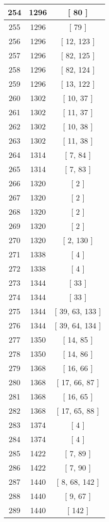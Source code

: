 \begin{center}
\begin{longtable}[H]{|| c c c ||}
254 & 1296 & [ 80 ] \\ 
\hline
255 & 1296 & [ 79 ] \\ 
\hline
256 & 1296 & [ 12, 123 ] \\ 
\hline
257 & 1296 & [ 82, 125 ] \\ 
\hline
258 & 1296 & [ 82, 124 ] \\ 
\hline
259 & 1296 & [ 13, 122 ] \\ 
\hline
260 & 1302 & [ 10, 37 ] \\ 
\hline
261 & 1302 & [ 11, 37 ] \\ 
\hline
262 & 1302 & [ 10, 38 ] \\ 
\hline
263 & 1302 & [ 11, 38 ] \\ 
\hline
264 & 1314 & [ 7, 84 ] \\ 
\hline
265 & 1314 & [ 7, 83 ] \\ 
\hline
266 & 1320 & [ 2 ] \\ 
\hline
267 & 1320 & [ 2 ] \\ 
\hline
268 & 1320 & [ 2 ] \\ 
\hline
269 & 1320 & [ 2 ] \\ 
\hline
270 & 1320 & [ 2, 130 ] \\ 
\hline
271 & 1338 & [ 4 ] \\ 
\hline
272 & 1338 & [ 4 ] \\ 
\hline
273 & 1344 & [ 33 ] \\ 
\hline
274 & 1344 & [ 33 ] \\ 
\hline
275 & 1344 & [ 39, 63, 133 ] \\ 
\hline
276 & 1344 & [ 39, 64, 134 ] \\ 
\hline
277 & 1350 & [ 14, 85 ] \\ 
\hline
278 & 1350 & [ 14, 86 ] \\ 
\hline
279 & 1368 & [ 16, 66 ] \\ 
\hline
280 & 1368 & [ 17, 66, 87 ] \\ 
\hline
281 & 1368 & [ 16, 65 ] \\ 
\hline
282 & 1368 & [ 17, 65, 88 ] \\ 
\hline
283 & 1374 & [ 4 ] \\ 
\hline
284 & 1374 & [ 4 ] \\ 
\hline
285 & 1422 & [ 7, 89 ] \\ 
\hline
286 & 1422 & [ 7, 90 ] \\ 
\hline
287 & 1440 & [ 8, 68, 142 ] \\ 
\hline
288 & 1440 & [ 9, 67 ] \\ 
\hline
289 & 1440 & [ 142 ] \\ 

\end{longtable}
\end{center}
